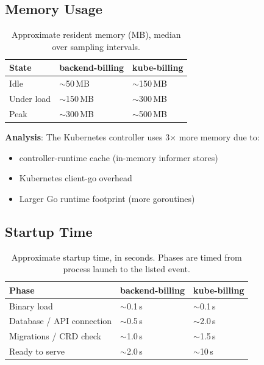 \subsection{Memory Usage}

\begin{table}[h]
\centering
\caption{Approximate resident memory (MB), median over sampling intervals.}
\label{tab:memory-usage}
\small\begin{tabularx}{\textwidth}{@{}lXX@{}}
\toprule
\textbf{State} & \textbf{backend-billing} & \textbf{kube-billing} \\ \midrule
Idle       & $\sim$50\,MB  & $\sim$150\,MB \\
Under load & $\sim$150\,MB & $\sim$300\,MB \\
Peak       & $\sim$300\,MB & $\sim$500\,MB \\ \bottomrule
\end{tabularx}
\end{table}

\textbf{Analysis}: The Kubernetes controller uses 3$\times$ more memory due to:
\begin{itemize}
    \item controller-runtime cache (in-memory informer stores)
    \item Kubernetes client-go overhead
    \item Larger Go runtime footprint (more goroutines)
\end{itemize}

\subsection{Startup Time}

\begin{table}[h]
\centering
\caption{Approximate startup time, in seconds. Phases are timed from process launch to the listed event.}
\label{tab:startup-time}
\small\begin{tabularx}{\textwidth}{@{}lXX@{}}
\toprule
\textbf{Phase} & \textbf{backend-billing} & \textbf{kube-billing} \\ \midrule
Binary load                 & $\sim$0.1\,s & $\sim$0.1\,s \\
Database / API connection   & $\sim$0.5\,s & $\sim$2.0\,s \\
Migrations / CRD check      & $\sim$1.0\,s & $\sim$1.5\,s \\
Ready to serve              & $\sim$2.0\,s & $\sim$10\,s  \\ \bottomrule
\end{tabularx}
\end{table}


